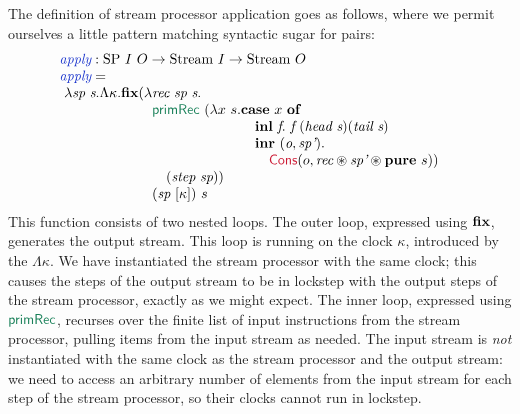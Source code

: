 The definition of stream processor application goes as follows, where
we permit ourselves a little pattern matching syntactic sugar for
pairs:
\begin{displaymath}
  \begin{array}{@{}l}
    \defn{apply} : \tyname{SP}~I~O \to \tyname{Stream}~I \to \tyname{Stream}~O \\
    \defn{apply} = \\
    \ \begin{array}[t]{@{}l@{}l}
      \lambda \ident{sp}~\ident{s}.\Lambda \kappa. \kw{fix}(\lambda&\ident{rec}~\ident{sp}~\ident{s}. \\
      & \elim{primRec}~(\lambda x~s.
      \begin{array}[t]{@{}l}
        \kw{case}~x~\kw{of} \\
        \quad \kw{inl}~\ident{f}.~\ident{f}~(\ident{head}~\ident{s}) (\ident{tail}~\ident{s}) \\
        \quad \kw{inr}~(\ident{o},\ident{sp'}).\\
        \quad \quad \cons{Cons}(o,\ident{rec} \circledast \ident{sp'} \circledast \kw{pure}~s))
      \end{array} \\
      & \quad (\ident{step}~\ident{sp})) \\
      & (\ident{sp}~[\kappa])~s
    \end{array}
  \end{array}
\end{displaymath}
This function consists of two nested loops. The outer loop, expressed
using $\textbf{fix}$, generates the output stream. This loop is running on
the clock $\kappa$, introduced by the $\Lambda \kappa$. We have
instantiated the stream processor with the same clock; this causes the
steps of the output stream to be in lockstep with the output steps of
the stream processor, exactly as we might expect. The inner loop,
expressed using $\elim{primRec}$, recurses over the finite list of
input instructions from the stream processor, pulling items from the
input stream as needed. The input stream is \emph{not} instantiated
with the same clock as the stream processor and the output stream: we
need to access an arbitrary number of elements from the input stream
for each step of the stream processor, so their clocks cannot run in
lockstep.

